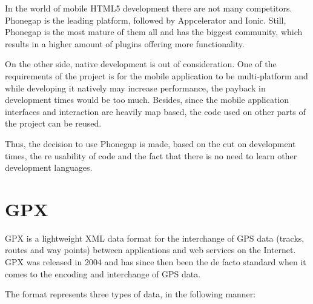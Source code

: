 In the world of mobile HTML5 development there are not many competitors. Phonegap is the leading platform, followed by Appcelerator and Ionic. Still, Phonegap is the most mature of them all and has the biggest community, which results in a higher amount of plugins offering more functionality.

On the other side, native development is out of consideration. One of the requirements of the project is for the mobile application to be multi-platform and while developing it natively may increase performance, the payback in development times would be too much. Besides, since the mobile application interfaces and interaction are heavily map based, the code used on other parts of the project can be reused.

Thus, the decision to use Phonegap is made, based on the cut on development times, the re usability of code and the fact that there is no need to learn other development languages.

\section{GPX}\label{gpx}

GPX is a lightweight XML data format for the interchange of GPS data (tracks, routes and way points) between applications and web services on the Internet\cite{gpx}. GPX was released in 2004 and has since then been the de facto standard when it comes to the encoding and interchange of GPS data.

The format represents three types of data, in the following manner:


